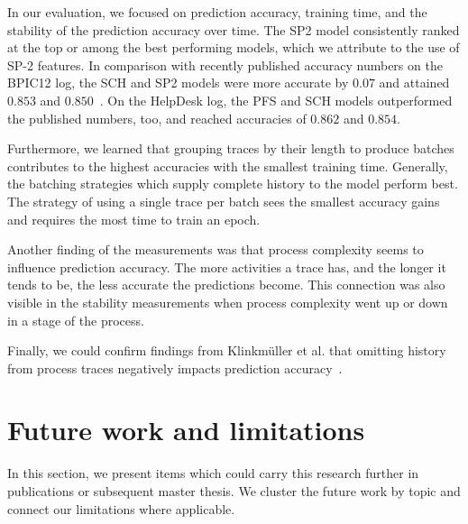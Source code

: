 In our evaluation, we focused on prediction accuracy, training time, and the stability of the prediction accuracy over time.
The SP2 model consistently ranked at the top or among the best performing models, which we attribute to the use of SP-2 features. In comparison with recently published accuracy numbers on the BPIC12 log, the SCH and SP2 models were more accurate by $0.07$ and attained $0.853$ and $0.850$~\cite{boehmer2018probability, evermann2016}.
On the HelpDesk log, the PFS and SCH models outperformed the published numbers, too, and reached accuracies of $0.862$ and $0.854$.

Furthermore, we learned that grouping traces by their length to produce batches contributes to the highest accuracies with the smallest training time.
Generally, the batching strategies which supply complete history to the model perform best.
The strategy of using a single trace per batch sees the smallest accuracy gains and requires the most time to train an epoch.

Another finding of the measurements was that process complexity seems to influence prediction accuracy.
The more activities a trace has, and the longer it tends to be, the less accurate the predictions become.
This connection was also visible in the stability measurements when process complexity went up or down in a stage of the process.

Finally, we could confirm findings from Klinkmüller et al. that omitting history from process traces negatively impacts prediction accuracy~\cite{klinkmuller2018reliablemonitoring}.

\section{Future work and limitations}\label{sec:conclusion:future-work}
In this section, we present items which could carry this research further in publications or subsequent master thesis.
We cluster the future work by topic and connect our limitations where applicable.

